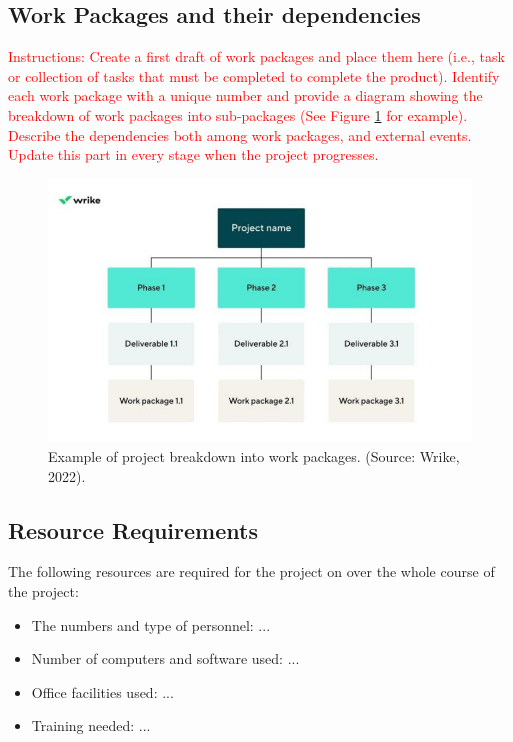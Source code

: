\documentclass{article}
\begin{document}
\subsection{Work Packages and their dependencies}
\textcolor{red}{Instructions: Create a first draft of work packages and place them here (i.e., task
or collection of tasks that must be completed to complete the product).
Identify each work package with a unique number and provide a diagram showing
the breakdown of work packages into sub-packages (See Figure \ref{wrike} for example).
Describe the dependencies both among work packages, and external events.
Update this part in every stage when the project progresses.}

\begin{figure}[h]
  \centering
  \includegraphics[width=1.0\textwidth]{wrike_2022.png}
  \caption{  Example of project breakdown into work packages. (Source: Wrike,
2022). }
  \label{wrike}
\end{figure}

\subsection{Resource Requirements}
The following resources are required for the project on over the whole course of
the project:
{\color{red}
\begin{itemize}
\item The numbers and type of personnel: ...
\item Number of computers and software used: ...
\item Office facilities used: ...
\item Training needed: ...
\end{itemize}
}
\end{document}
